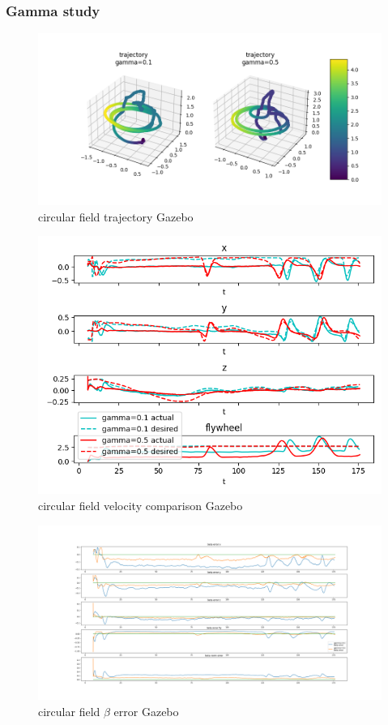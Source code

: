 \subsubsection{Gamma study}
\begin{figure}[h!]
   \centering
   \includegraphics[width=\linewidth]{Images/gazebo_trajectory_gamma_circular.png}
   \caption{circular field trajectory Gazebo}
   \label{fig:trajgazebocirculargamma}
\end{figure}
\begin{figure}[h!]
   \centering
   \includegraphics[width=\linewidth]{Images/gazebo_circular_gamma_V.png}
   \caption{circular field velocity comparison Gazebo}
   \label{fig:velgazebocirculargamma}
\end{figure}
\begin{figure}[h!]
   \centering
   \includegraphics[width=\linewidth]{Images/gazebo_betaerror_gamma_circular.png}
   \caption{circular field $\beta$ error Gazebo}
   \label{fig:betaerrorgazebocirculargamma}
\end{figure}

